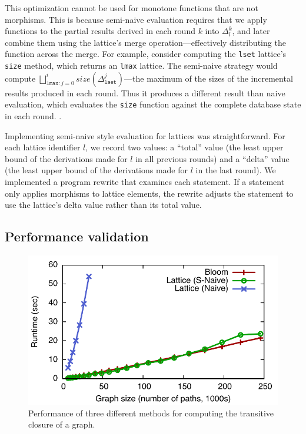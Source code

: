 This optimization cannot be used for monotone functions that are not
morphisms. This is because semi-naive evaluation requires that we apply
functions to the partial results derived in each round $k$ into $\Delta_l^k$,
and later combine them using the lattice's merge operation---effectively
distributing the function across the merge.  For example, consider computing the
\texttt{lset} lattice's \texttt{size} method, which returns an \texttt{lmax}
lattice. The semi-naive strategy would compute
$\bigsqcup_{\mathtt{lmax}:j=0}^i size(\Delta^j_{\mathtt{lset}})$---the maximum of
the sizes of the incremental results produced in each round.  Thus it produces a
different result than naive evaluation, which evaluates the \texttt{size}
function against the complete database state in each round.  .

Implementing semi-naive style evaluation for lattices was straightforward. For
each lattice identifier $l$, we record two values: a ``total'' value (the least
upper bound of the derivations made for $l$ in all previous rounds) and a
``delta'' value (the least upper bound of the derivations made for $l$ in the
last round). We implemented a program rewrite that examines each \lang
statement. If a statement only applies morphisms to lattice elements, the
rewrite adjusts the statement to use the lattice's delta value rather than its
total value.


\subsection{Performance validation}
\label{sec:lattice-perf}

\begin{figure}[t]
\centering
\includegraphics[width=\linewidth]{fig/sn_perf}
\caption{Performance of three different methods for computing the
  transitive closure of a graph.}
\label{fig:tc-perf-graph}
\end{figure}

